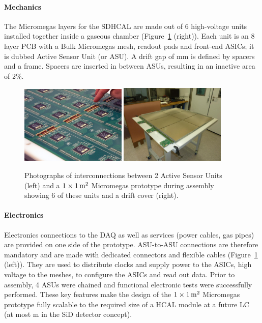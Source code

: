 \paragraph{Mechanics}
The Micromegas layers for the SDHCAL are made out of 6 high-voltage units installed together inside a gaseous chamber (Figure~\ref{mecha_elec} (right)). Each unit is an 8 layer PCB with a Bulk Micromegas mesh, readout pads and front-end ASICs; it is dubbed Active Sensor Unit (or ASU). A drift gap of \unit[3]{mm} is defined by spacers and a frame. Spacers are inserted in between ASUs, resulting in an inactive area of 2\%.


\begin{figure}
\begin{centering}
\includegraphics[width=0.45\textwidth]{Calorimeter/SDHCAL/interconnects}
\includegraphics[width=0.45\textwidth]{Calorimeter/SDHCAL/m2_assembly}
\caption{Photographs of interconnections between 2 Active Sensor Units (left) and a $1\times \unit[1]{m^{2}}$ Micromegas prototype during assembly showing 6 of these units and a drift cover (right).}
\label{mecha_elec}
\end{centering}
\end{figure}


\paragraph{Electronics}
Electronics connections to the DAQ as well as services (power cables, gas pipes) are provided on one side of the prototype. ASU-to-ASU connections are therefore mandatory and are made with dedicated connectors and flexible cables (Figure~\ref{mecha_elec} (left)). They are used to distribute clocks and supply power to the ASICs, high voltage to the meshes, to configure the ASICs and read out data. Prior to assembly, 4 ASUs were chained and functional electronic tests were successfully performed. These key features make the design of the $1\times \unit[1]{m^{2}}$ Micromegas prototype fully scalable to the required size of a HCAL module at a future LC (at most \unit[2]{m} in the SiD detector concept).

